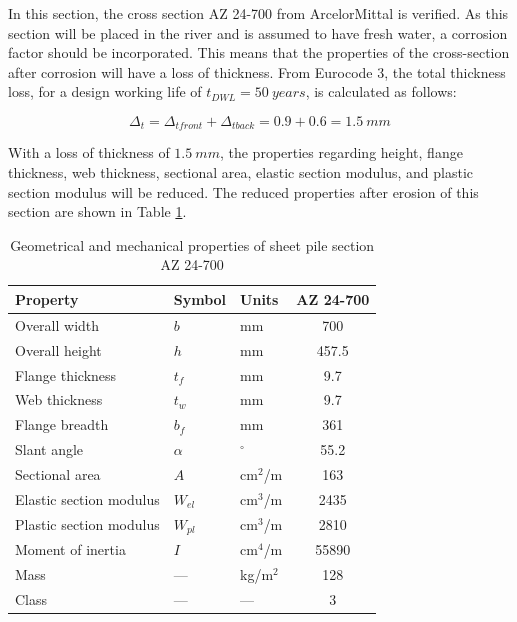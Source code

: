 In this section, the cross section AZ 24-700 from ArcelorMittal is verified. As this section will be placed in the river and is assumed to have fresh water, a corrosion factor should be incorporated. This means that the properties of the cross-section after corrosion will have a loss of thickness. From Eurocode 3, the total thickness loss, for a design working life of $t_{DWL} = 50 \ years $, is calculated as follows:

\begin{equation}
    \Delta_{t} = \Delta_{tfront} +  \Delta_{tback} = 0.9 + 0.6= 1.5 \ mm 
    \label{limit_state}
\end{equation}

With a loss of thickness of $1.5 \ mm$, the properties regarding height, flange thickness, web thickness, sectional area, elastic section modulus, and plastic section modulus will be reduced. The reduced properties after erosion of this section are shown in Table \ref{tab:pu32}.


\begin{table}[H]
  \centering
  \small
  \setlength{\tabcolsep}{6pt}
  \renewcommand{\arraystretch}{1.15}
  \caption{Geometrical and mechanical properties of sheet pile section AZ 24-700}
  \label{tab:pu32}
  \begin{tabular}{@{}l l l c@{}}
    \toprule
    Property & Symbol & Units & AZ 24-700 \\
    \midrule
    Overall width                & $b$     & mm     & 700   \\
    Overall height               & $h$     & mm     & 457.5   \\
    Flange thickness             & $t_f$   & mm     & 9.7  \\
    Web thickness                & $t_w$   & mm     & 9.7  \\
    Flange breadth               & $b_f$   & mm     & 361   \\
    Slant angle                  & $\alpha$ & $^\circ$ & 55.2 \\
    Sectional area               & $A$     & cm$^2$/m & 163 \\
    Elastic section modulus      & $W_{el}$ & cm$^3$/m & 2435 \\
    Plastic section modulus      & $W_{pl}$ & cm$^3$/m & 2810 \\
    Moment of inertia            & $I$     & cm$^4$/m & 55890 \\
    Mass                         & ---     & kg/m$^2$ & 128 \\
    Class    & ---     & ---     & 3 \\
    \bottomrule
  \end{tabular}
\end{table}

